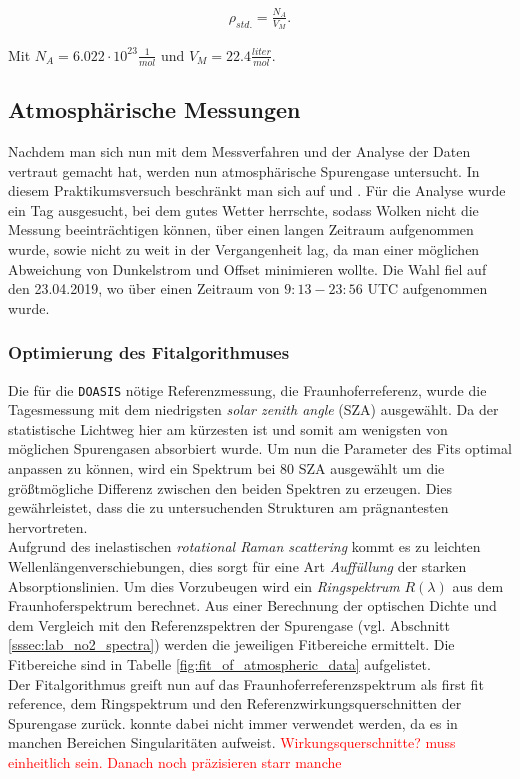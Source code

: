 \documentclass[12pt, a4paper, bibliography=totoc]{scrartcl}
\begin{document}
\begin{multicols}{2}
\begin{align}
	\rho_{std.} = \frac{N_A}{V_M}.
\end{align}
 	
Mit $N_A = 6.022 \cdot 10^{23} \frac{1}{\si{mol}}$ und $V_M = 22.4 \frac{\si{liter}}{\si{mol}}$.

\subsection{Atmosphärische Messungen}\label{ssec:atmospheric_measurements}

Nachdem man sich nun mit dem Messverfahren und der Analyse der Daten vertraut gemacht hat, werden nun atmosphärische Spurengase untersucht. In diesem Praktikumsversuch beschränkt man sich auf  und .
Für die Analyse wurde ein Tag ausgesucht, bei dem gutes Wetter herrschte, sodass Wolken nicht die Messung beeinträchtigen können, über einen langen Zeitraum aufgenommen wurde, sowie nicht zu weit in der Vergangenheit lag, da man einer möglichen Abweichung von Dunkelstrom und Offset minimieren wollte.
Die Wahl fiel auf den 23.04.2019, wo über einen Zeitraum von $9:13 - 23:56$ UTC aufgenommen wurde.

\subsubsection{Optimierung des Fitalgorithmuses}\label{sssec:configure_fit}

Die für die \verb*+DOASIS+ nötige Referenzmessung, die Fraunhoferreferenz, wurde die Tagesmessung mit dem niedrigsten
\textit{solar zenith angle} (SZA) ausgewählt. Da der statistische Lichtweg hier am kürzesten ist und somit am wenigsten von möglichen Spurengasen absorbiert wurde.
Um nun die Parameter des Fits optimal anpassen zu können, wird ein Spektrum bei $80$ SZA ausgewählt um die größtmögliche Differenz zwischen den beiden Spektren zu erzeugen. Dies gewährleistet, dass die zu untersuchenden Strukturen am prägnantesten hervortreten.
\\
Aufgrund des inelastischen \textit{rotational Raman scattering} kommt es zu leichten Wellenlängenverschiebungen, dies sorgt für eine Art \textit{Auffüllung} der starken Absorptionslinien.
Um dies Vorzubeugen wird ein \textit{Ringspektrum} $R(\lambda)$ aus dem Fraunhoferspektrum berechnet.
Aus einer Berechnung der optischen Dichte und dem Vergleich mit den Referenzspektren der Spurengase (vgl. Abschnitt \ref{sssec:lab_no2_spectra}) werden die jeweiligen Fitbereiche ermittelt. Die Fitbereiche sind in Tabelle \ref{fig:fit_of_atmospheric_data} aufgelistet.
\\
Der Fitalgorithmus greift nun auf das Fraunhoferreferenzspektrum als first fit reference, dem Ringspektrum und den Referenzwirkungsquerschnitten der Spurengase zurück.  konnte dabei nicht immer verwendet werden, da es in manchen Bereichen Singularitäten aufweist.
\textcolor{red}{Wirkungsquerschnitte? muss einheitlich sein. Danach noch präzisieren starr manche}


\end{multicols}
\end{document}
